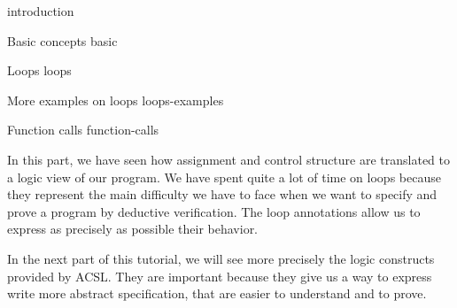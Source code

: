 \begin{levelTwo}
  {}
  {introduction}
\end{levelTwo}

\begin{levelTwo}
  {Basic concepts}
  {basic}
\end{levelTwo}

\begin{levelTwo}
  {Loops}
  {loops}
\end{levelTwo}

\begin{levelTwo}
  {More examples on loops}
  {loops-examples}
\end{levelTwo}

\begin{levelTwo}
  {Function calls}
  {function-calls}
\end{levelTwo}

\horizontalLine
\newpage


In this part, we have seen how assignment and control structure are translated
to a logic view of our program. We have spent quite a lot of time on loops
because they represent the main difficulty we have to face when we want to
specify and prove a program by deductive verification. The loop annotations
allow us to express as precisely as possible their behavior.



In the next part of this tutorial, we will see more precisely the logic
constructs provided by ACSL. They are important because they give us a way to
express write more abstract specification, that are easier to understand and
to prove.
